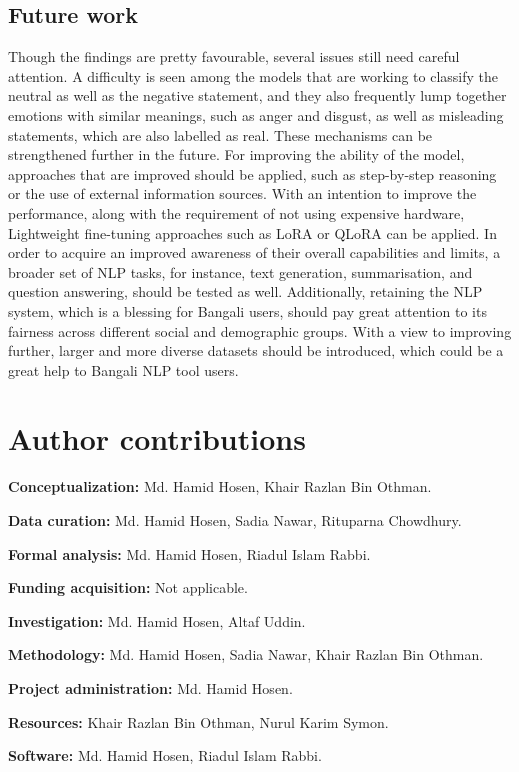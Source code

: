 \documentclass[10pt,letterpaper]{article}
\begin{document}
\subsection*{Future work}
Though the findings are pretty favourable, several issues still need careful attention. A difficulty is seen among the models that are working to classify the neutral as well as the negative statement, and they also frequently lump together emotions with similar meanings, such as anger and disgust, as well as misleading statements, which are also labelled as real. These mechanisms can be strengthened further in the future. For improving the ability of the model, approaches that are improved should be applied, such as step-by-step reasoning or the use of external information sources. With an intention to improve the performance, along with the requirement of not using expensive hardware, Lightweight fine-tuning approaches such as LoRA or QLoRA can be applied. In order to acquire an improved awareness of their overall capabilities and limits, a broader set of NLP tasks, for instance, text generation, summarisation, and question answering, should be tested as well. Additionally, retaining the NLP system, which is a blessing for Bangali users, should pay great attention to its fairness across different social and demographic groups. With a view to improving further, larger and more diverse datasets should be introduced, which could be a great help to Bangali NLP tool users.

\section*{Author contributions}

\textbf{Conceptualization:} Md. Hamid Hosen, Khair Razlan Bin Othman.

\textbf{Data curation:} Md. Hamid Hosen, Sadia Nawar, Rituparna Chowdhury.

\textbf{Formal analysis:} Md. Hamid Hosen, Riadul Islam Rabbi.

\textbf{Funding acquisition:} Not applicable.

\textbf{Investigation:} Md. Hamid Hosen, Altaf Uddin.

\textbf{Methodology:} Md. Hamid Hosen, Sadia Nawar, Khair Razlan Bin Othman.

\textbf{Project administration:} Md. Hamid Hosen.

\textbf{Resources:} Khair Razlan Bin Othman, Nurul Karim Symon.

\textbf{Software:} Md. Hamid Hosen, Riadul Islam Rabbi.
\end{document}
